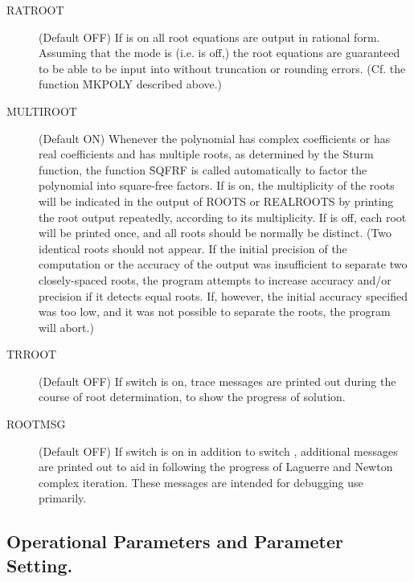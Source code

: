 \begin{description}
\item[RATROOT] (Default OFF) If  is on all root equations are
output in rational form.  Assuming that the mode is  (i.e.
 is off,) the root equations are
guaranteed to be able to be input into \REDUCE{} without truncation or
rounding errors. (Cf. the function \f{MKPOLY} described above.)

\item[MULTIROOT] (Default ON) Whenever the polynomial has complex
coefficients or has real coefficients and has multiple roots, as
 determined by the Sturm function, the function \f{SQFRF}
is called automatically to factor the polynomial into square-free factors.
If  is on, the multiplicity of the roots will be indicated
in the output of ROOTS or REALROOTS by printing the root output
repeatedly, according to its multiplicity.  If  is off,
each root will be printed once, and all roots should be normally be
distinct. (Two identical roots should not appear.  If the initial
precision of the computation or the accuracy of the output was
insufficient to separate two closely-spaced roots, the program attempts to
increase accuracy and/or precision if it detects equal roots.  If,
however, the initial accuracy specified was too low, and it was not
possible to separate the roots, the program will abort.)

\item[TRROOT] (Default OFF) If switch  is on, trace messages
are printed out during the course of root determination, to show the
progress of solution.

\item[ROOTMSG] (Default OFF) If switch
 is on in addition to switch , additional
messages are printed out to aid in following the progress of Laguerre and
Newton complex iteration.  These messages are intended for debugging use
primarily.


\end{description}


\subsection{Operational Parameters and Parameter Setting.}

